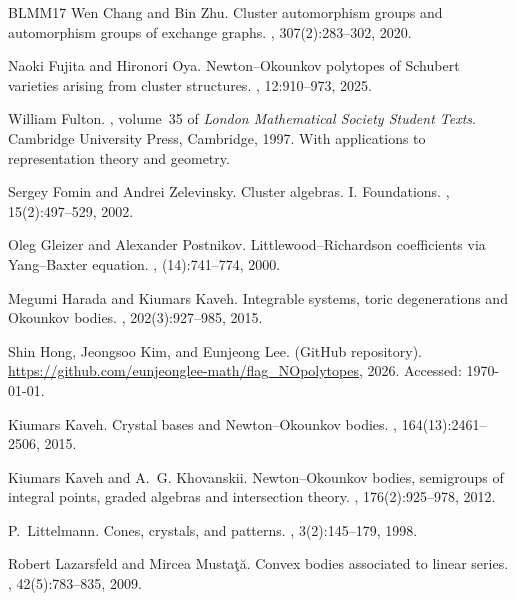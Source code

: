 \documentclass[10pt]{amsart}
\numberwithin{equation}{section}
\theoremstyle{plain}
\theoremstyle{definition}
\theoremstyle{remark}
\begin{document}
\begin{thebibliography}{BLMM17}
	Wen Chang and Bin Zhu.
	\newblock Cluster automorphism groups and automorphism groups of exchange
	graphs.
	, 307(2):283--302, 2020.
	
	Naoki Fujita and Hironori Oya.
	\newblock Newton--{O}kounkov polytopes of {S}chubert varieties arising from
	cluster structures.
	, 12:910--973, 2025.
	
	William Fulton.
	, volume~35 of {\em London Mathematical Society
		Student Texts}.
	\newblock Cambridge University Press, Cambridge, 1997.
	\newblock With applications to representation theory and geometry.
	
	Sergey Fomin and Andrei Zelevinsky.
	\newblock Cluster algebras. {I}. {F}oundations.
	, 15(2):497--529, 2002.
	
	Oleg Gleizer and Alexander Postnikov.
	\newblock Littlewood--{R}ichardson coefficients via {Y}ang--{B}axter equation.
	, (14):741--774, 2000.
	
	Megumi Harada and Kiumars Kaveh.
	\newblock Integrable systems, toric degenerations and {O}kounkov bodies.
	, 202(3):927--985, 2015.
	
	Shin Hong, Jeongsoo Kim, and Eunjeong Lee.
	 ({GitHub} repository).
	\newblock \url{https://github.com/eunjeonglee-math/flag_NOpolytopes}, 2026.
	\newblock Accessed: \today.
	
	Kiumars Kaveh.
	\newblock Crystal bases and {N}ewton--{O}kounkov bodies.
	, 164(13):2461--2506, 2015.
	
	Kiumars Kaveh and A.~G. Khovanskii.
	\newblock Newton--{O}kounkov bodies, semigroups of integral points, graded
	algebras and intersection theory.
	, 176(2):925--978, 2012.
	
	P.~Littelmann.
	\newblock Cones, crystals, and patterns.
	, 3(2):145--179, 1998.
	
	Robert Lazarsfeld and Mircea Musta\c{t}\u{a}.
	\newblock Convex bodies associated to linear series.
	, 42(5):783--835, 2009.
	

\end{thebibliography}
\end{document}
